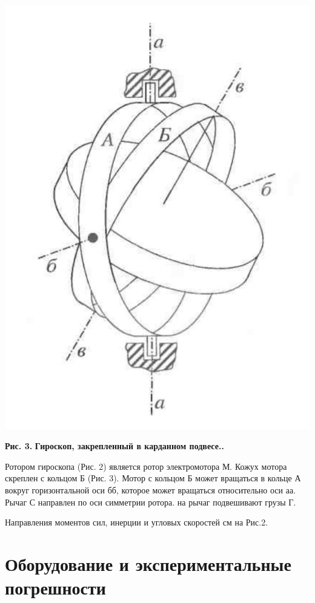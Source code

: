 \begin{center}
\includegraphics[scale = 0.18]{kard.jpeg}
\end{center}
\begin{flushright}
{\scriptsize \textbf{Рис. 3.} \textbf {Гироскоп, закрепленный в карданном подвесе..}}
\end{flushright}

    Ротором гироскопа (Рис. 2) является ротор электромотора М. Кожух мотора скреплен с кольцом Б (Рис. 3). Мотор с кольцом Б может вращаться в кольце А вокруг горизонтальной оси бб, которое может вращаться относительно оси аа. Рычаг С направлен по оси симметрии ротора. на рычаг подвешивают грузы Г.
    
    Направления моментов сил, инерции и угловых скоростей см на Рис.2.

\section{Оборудование и экспериментальные погрешности}


